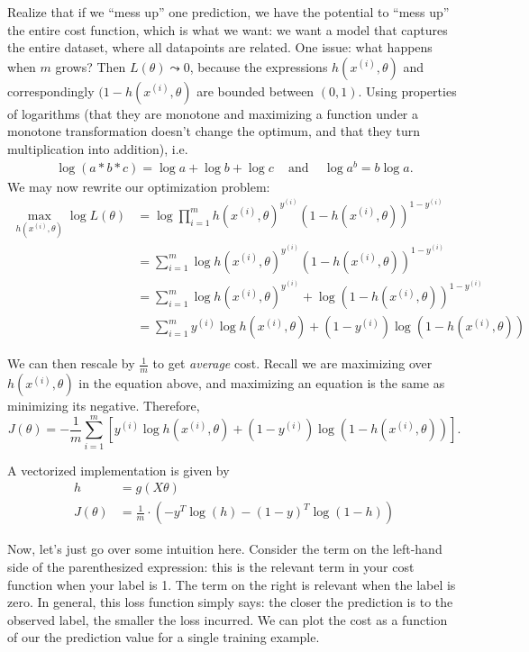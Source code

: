 \documentclass[12pt]{article}
\begin{document}
Realize that if we ``mess up'' one prediction, we have the potential to ``mess up'' the entire cost function, which is what we want: we want a model that captures the entire dataset, where all datapoints are related. One issue: what happens when $m$ grows? Then $L(\theta) \leadsto 0$, because the expressions
$h(x^{(i)}, \theta)$ and correspondingly $(1 - h(x^{(i)}, \theta)$ are bounded between $(0,1)$. Using properties of logarithms (that they are monotone and maximizing a function under a monotone transformation doesn't change the optimum, and that they turn multiplication into addition), i.e.
\begin{align*}
  \log(a*b*c) = \log a + \log b + \log c \, \, \, \, \, \textrm{ and } \, \, \, \, \, \log a^b = b \log a.
\end{align*}
We may now rewrite our optimization problem:
\begin{align*}
  \max_{h(x^{(i)}, \theta)} \log L(\theta) &= \log \prod_{i=1}^{m} h(x^{(i)},                                              \theta)^{y^{(i)}} \left(1 - h(x^{(i)}, \theta)\right)^{1 - y^{(i)}} \\
  &= \sum_{i=1}^{m} \log h(x^{(i)}, \theta)^{y^{(i)}} \left(1 - h(x^{(i)},     \theta)\right)^{1 - y^{(i)}} \\
  &= \sum_{i=1}^{m} \log h(x^{(i)}, \theta)^{y^{(i)}}  + \log \left(1 - h(x^{(i)}, \theta)\right)^{1 - y^{(i)}} \\
  &= \sum_{i=1}^{m} y^{(i)} \log h(x^{(i)}, \theta) + (1 - y^{(i)}) \log \left(1 - h(x^{(i)}, \theta)\right)  
\end{align*}

We can then rescale by $\frac{1}{m}$ to get \emph{average} cost. Recall we are maximizing over $h(x^{(i)}, \theta)$ in the equation above, and maximizing an equation is the same as minimizing its negative. Therefore,
\[
  J(\theta) = -\frac{1}{m} \sum_{i=1}^{m} \left[ y^{(i)} \log h(x^{(i)}, \theta) + (1 - y^{(i)}) \log \left(1 - h(x^{(i)}, \theta)\right)\right]. 
\]

A vectorized implementation is given by
\begin{align*}
  h &= g(X\theta) \\
  J(\theta) &= \frac{1}{m} \cdot \left(-y^T \log(h) - \left(1 - y \right)^T \log (1 - h)\right)
\end{align*}

Now, let's just go over some intuition here. Consider the term on the left-hand side of the parenthesized expression: this is the relevant term in your cost function when your label is 1. The term on the right is relevant when the label is zero. In general, this loss function simply says: the closer the prediction is to the observed label, the smaller the loss incurred. We can plot the cost as a function of our the prediction value for a single training example.
\end{document}
